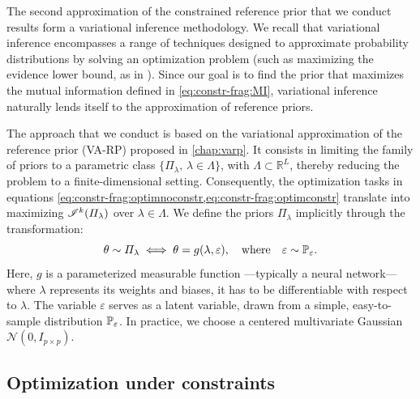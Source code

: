 The second approximation of the constrained reference prior that we conduct results form a variational inference methodology.
We recall that
variational inference encompasses a range of techniques designed to approximate probability distributions by solving an optimization problem (such as maximizing the evidence lower bound, as in \cite{kingma_auto-encoding_2014}). 
Since our goal is to find
the prior that maximizes the mutual information defined in \cref{eq:constr-frag:MI}, variational inference naturally lends itself to the approximation of reference priors.  

The approach that we conduct is based on the variational approximation of the reference prior (VA-RP) proposed in   \cref{chap:varp}.
It consists in limiting the family of priors to a parametric class $\{\varPi_\lambda,\,\lambda\in\Lambda\}$, with $\Lambda\subset\mathbb{R}^L$, thereby reducing the problem to a finite-dimensional setting. Consequently, the optimization tasks in equations \cref{eq:constr-frag:optimnoconstr,eq:constr-frag:optimconstr} %
translate into maximizing $\mathscr{I}^k(\varPi_\lambda)$ over $\lambda\in\Lambda$. We define the priors $\varPi_\lambda$ implicitly through the transformation:
\begin{equation}
    \theta \sim \varPi_{\lambda} \iff \theta = g(\lambda,\varepsilon), \quad \text{where} \quad \varepsilon \sim \mathbb{P}_{\varepsilon}.
\end{equation}
Here, $g$ is a parameterized measurable function ---typically a neural network--- where $\lambda$ represents its weights and biases, it has to be differentiable with respect to $\lambda$. The variable $\varepsilon$ serves as a latent variable, drawn from a simple, easy-to-sample distribution $\mathbb{P}_\varepsilon$. In practice, we choose a centered multivariate Gaussian $\mathcal{N}(0,I_{p\times p})$.  














\subsection{Optimization under constraints}\label{sec:constr-frags:subsec:optim}


